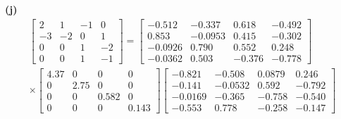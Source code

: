 \begin{resolution}
  \vspace{12pt}
  {\bf (j)}\; \begin{multline*}\begin{bmatrix}
      2 & 1 & -1 & 0 \\ -3 & -2 & 0 & 1 \\ 0 & 0 & 1 & -2 \\ 0 & 0 & 1 & -1
    \end{bmatrix} = \begin{bmatrix}
      -0.512  & -0.337  & 0.618  & -0.492 \\
      0.853   & -0.0953 & 0.415  & -0.302 \\
      -0.0926 & 0.790   & 0.552  & 0.248  \\
      -0.0362 & 0.503   & -0.376 & -0.778
    \end{bmatrix} \\ \times \begin{bmatrix}
      4.37 & 0 & 0 & 0 \\ 0 & 2.75 & 0 & 0 \\ 0 & 0 & 0.582 & 0 \\ 0 & 0 & 0 & 0.143
    \end{bmatrix}  \begin{bmatrix}
      -0.821  & -0.508 & 0.0879 & 0.246  \\ -0.141 & -0.0532 & 0.592 & -0.792\\
      -0.0169 & -0.365 & -0.758 & -0.540 \\ -0.553 & 0.778 & -0.258 & -0.147
    \end{bmatrix}\end{multline*}

\end{resolution}


